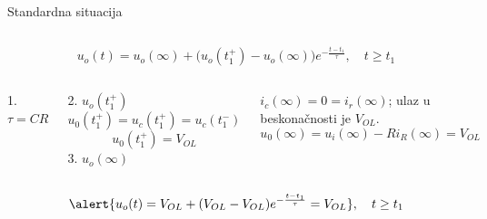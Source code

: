 \begin{frame}[label=08-s058]{Standardna situacija}
\setlength{\parskip}{0pt}
\setlength{\abovedisplayskip}{4pt}\setlength{\belowdisplayskip}{4pt}
\begin{columns}[c,onlytextwidth]
\centering
{}\centering
\end{columns}
\[u_o(t)=u_o(\infty)+\bigl(u_o(t_1^+)-u_o(\infty)\bigr)e^{-\frac{t-t_1}{\tau}},\quad t\geq t_1\]
\begin{columns}[T,onlytextwidth]
1. $\tau=CR$\par
2. $u_o(t_1^+)$
\[u_0(t_1^+)=u_c(t_1^+)=u_c(t_1^-)\]
\[u_0(t_1^+)=V_{OL}\]
3. $u_o(\infty)$\par
$i_c(\infty)=0=i_r(\infty)$; ulaz u beskonačnosti je $V_{OL}$.
\[u_0(\infty)=u_i(\infty)-Ri_R(\infty)=V_{OL}\]
\end{columns}

\[\alert{u_o(t)=V_{OL}+(V_{OL}-V_{OL})e^{-\frac{t-t_1}{\tau}}=V_{OL}},\quad t\geq t_1\]
\hfill{}
\end{frame}
